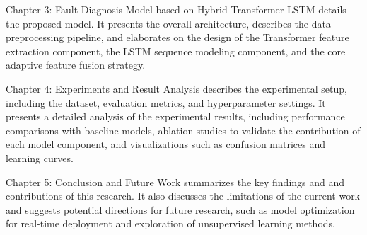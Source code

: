 Chapter 3: Fault Diagnosis Model based on Hybrid Transformer-LSTM details the proposed model. It presents the overall architecture, describes the data preprocessing pipeline, and elaborates on the design of the Transformer feature extraction component, the LSTM sequence modeling component, and the core adaptive feature fusion strategy.

Chapter 4: Experiments and Result Analysis describes the experimental setup, including the dataset, evaluation metrics, and hyperparameter settings. It presents a detailed analysis of the experimental results, including performance comparisons with baseline models, ablation studies to validate the contribution of each model component, and visualizations such as confusion matrices and learning curves.

Chapter 5: Conclusion and Future Work summarizes the key findings and and contributions of this research. It also discusses the limitations of the current work and suggests potential directions for future research, such as model optimization for real-time deployment and exploration of unsupervised learning methods.